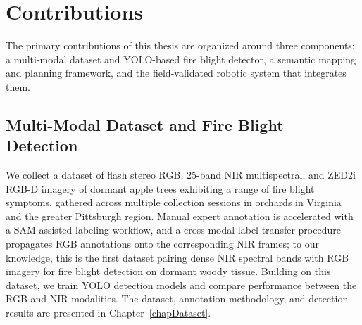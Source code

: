 

\section{Contributions} \label{secContributions}

The primary contributions of this thesis are organized around three
components: a multi-modal dataset and YOLO-based fire blight detector, a
semantic mapping and planning framework, and the field-validated robotic
system that integrates them.

\subsection{Multi-Modal Dataset and Fire Blight Detection}

We collect a dataset of flash stereo RGB, 25-band NIR multispectral, and ZED2i
RGB-D imagery of dormant apple trees exhibiting a range of fire blight
symptoms, gathered across multiple collection sessions in orchards in Virginia
and the greater Pittsburgh region.
Manual expert annotation is accelerated with a SAM-assisted labeling workflow,
and a cross-modal label transfer procedure propagates RGB annotations onto the
corresponding NIR frames; to our knowledge, this is the first dataset pairing
dense NIR spectral bands with RGB imagery for fire blight detection on dormant
woody tissue.
Building on this dataset, we train YOLO detection models and compare
performance between the RGB and NIR modalities.
The dataset, annotation methodology, and detection results are presented in
Chapter~\ref{chapDataset}.

